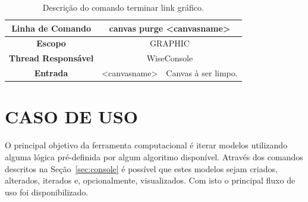 \begin{center}
	\begin{table}[!htbp]
		\begin{tabular}{|c|c|m{}|}
			\hline
			\textbf{Linha de Comando} & \multicolumn{2}{c|}{canvas purge <canvas\underline{\space\space}name>} \\
			\hline
			\textbf{Escopo} & \multicolumn{2}{c|}{GRAPHIC} \\
			\hline
			\textbf{Thread Responsável} & \multicolumn{2}{c|}{WiseConsole} \\
			\hline
			\textbf{Entrada} & <canvas\underline{\space\space}name> & Canvas à ser limpo. \\
			\hline
		\end{tabular}
		\caption{Descrição do comando terminar link gráfico.}
		\label{tab:graphic_purge}
	\end{table}
\end{center}

\section{CASO DE USO}\label{sec:caso_de_uso}

O principal objetivo da ferramenta computacional é iterar modelos utilizando alguma lógica pré-definida por algum algoritmo disponível. Através dos comandos descritos na Seção~\ref{sec:console} é possível que estes modelos sejam criados, alterados, iterados e, opcionalmente, visualizados. Com isto o principal fluxo de uso foi disponibilizado.

